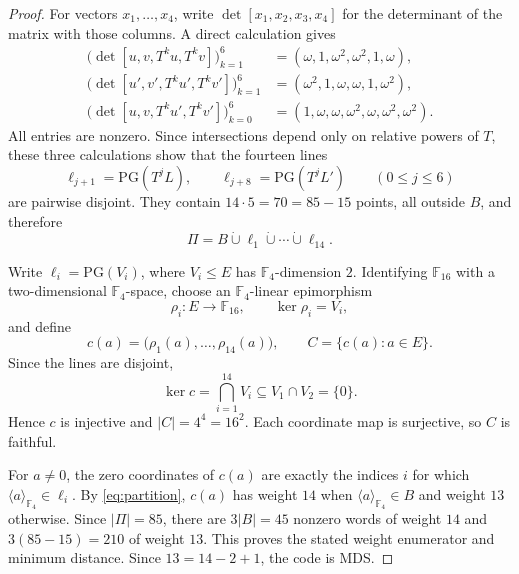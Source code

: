 \documentclass[11pt]{amsart}
\theoremstyle{remark}
\newcommand{\F}{\mathbb F}
\newcommand{\PG}{\mathrm{PG}}
\begin{document}
\begin{proof}
For vectors $x_1,\ldots,x_4$, write
$\det[x_1,x_2,x_3,x_4]$ for the determinant of the matrix with those
columns. A direct calculation gives
\begin{align*}
 \bigl(\det[u,v,T^ku,T^kv]\bigr)_{k=1}^{6}
   &=(\omega,1,\omega^2,\omega^2,1,\omega),\\
 \bigl(\det[u',v',T^ku',T^kv']\bigr)_{k=1}^{6}
   &=(\omega^2,1,\omega,\omega,1,\omega^2),\\
 \bigl(\det[u,v,T^ku',T^kv']\bigr)_{k=0}^{6}
   &=(1,\omega,\omega,\omega^2,\omega,\omega^2,\omega^2).
\end{align*}
All entries are nonzero. Since intersections depend only on relative
powers of $T$, these three calculations show that the fourteen lines
\[
  \ell_{j+1}=\PG(T^jL),\qquad
  \ell_{j+8}=\PG(T^jL')\qquad(0\le j\le6)
\]
are pairwise disjoint. They contain $14\cdot5=70=85-15$ points, all
outside $B$, and therefore
\begin{equation}\label{eq:partition}
  \Pi=B\mathbin{\dot\cup}\ell_1\mathbin{\dot\cup}\cdots
       \mathbin{\dot\cup}\ell_{14}.
\end{equation}

Write $\ell_i=\PG(V_i)$, where $V_i\le E$ has $\F_4$-dimension $2$.
Identifying $\F_{16}$ with a two-dimensional $\F_4$-space, choose an
$\F_4$-linear epimorphism
\[
  \rho_i:E\longrightarrow\F_{16},
  \qquad \ker\rho_i=V_i,
\]
and define
\[
  c(a)=\bigl(\rho_1(a),\ldots,\rho_{14}(a)\bigr),
  \qquad C=\{c(a):a\in E\}.
\]
Since the lines are disjoint,
\[
  \ker c=\bigcap_{i=1}^{14}V_i
  \subseteq V_1\cap V_2=\{0\}.
\]
Hence $c$ is injective and $|C|=4^4=16^2$. Each coordinate map is
surjective, so $C$ is faithful.

For $a\ne0$, the zero coordinates of $c(a)$ are exactly the indices $i$
for which $\langle a\rangle_{\F_4}\in\ell_i$. By
\eqref{eq:partition}, $c(a)$ has weight $14$ when
$\langle a\rangle_{\F_4}\in B$ and weight $13$ otherwise. Since
$|\Pi|=85$, there are $3|B|=45$ nonzero words of weight $14$ and
$3(85-15)=210$ of weight $13$. This proves the stated weight enumerator
and minimum distance. Since $13=14-2+1$, the code is MDS.


\end{proof}
\end{document}
